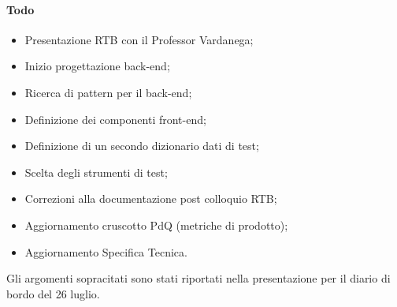 \paragraph{Todo}
\begin{itemize}
	\item Presentazione RTB con il Professor Vardanega;
	\item Inizio progettazione back-end;
	\item Ricerca di pattern per il back-end;
	\item Definizione dei componenti front-end;
	\item Definizione di un secondo dizionario dati di test;
	\item Scelta degli strumenti di test;
	\item Correzioni alla documentazione post colloquio RTB;
	\item Aggiornamento cruscotto PdQ (metriche di prodotto);
	\item Aggiornamento Specifica Tecnica.
\end{itemize}

\vspace{0.5\baselineskip}
\par Gli argomenti sopracitati sono stati riportati nella presentazione per il diario di bordo del 26 luglio.